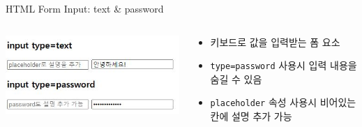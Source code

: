 \documentclass{beamer}
\begin{document}
    \begin{frame}{HTML Form Input: text \& password}
        \begin{columns}
            \begin{column}{0.35\linewidth}
                \includegraphics[width=\linewidth]{Images/input_text_password.JPG}
            \end{column}
            \begin{column}{0.65\linewidth}
                \begin{itemize}
                    \item 키보드로 값을 입력받는 폼 요소
                    \item \texttt{type=password} 사용시 입력 내용을 숨길 수 있음
                    \item \texttt{placeholder} 속성 사용시 비어있는 칸에 설명 추가 가능
                \end{itemize}
            \end{column}
        \end{columns}
    \end{frame}
\end{document}
